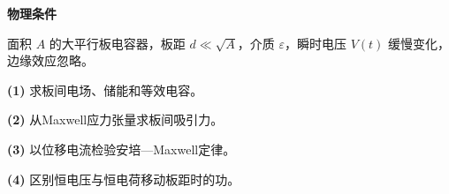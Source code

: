 \textbf{物理条件}\par 面积 \(A\) 的大平行板电容器，板距 \(d\ll\sqrt A\)，介质 \(\varepsilon\)，瞬时电压 \(V(t)\) 缓慢变化，边缘效应忽略。
\par\noindent\textbf{(1)} 求板间电场、储能和等效电容。
\par\noindent\textbf{(2)} 从Maxwell应力张量求板间吸引力。
\par\noindent\textbf{(3)} 以位移电流检验安培—Maxwell定律。
\par\noindent\textbf{(4)} 区别恒电压与恒电荷移动板距时的功。
